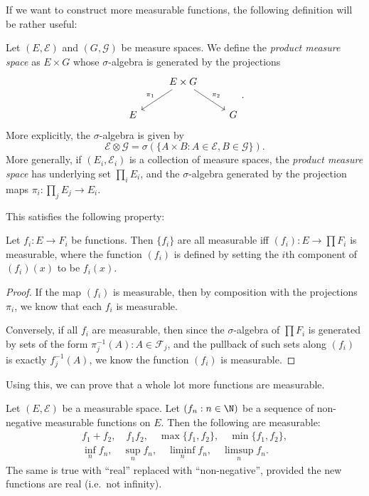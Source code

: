 \documentclass[a4paper]{article}
\begin{document}
If we want to construct more measurable functions, the following definition will be rather useful:
\begin{defi}
  Let $(E, \mathcal{E})$ and $(G, \mathcal{G})$ be measure spaces. We define the \emph{product measure space} as $E \times G$ whose $\sigma$-algebra is generated by the projections
  \[
    \begin{tikzcd}
      & E \times G \ar[ld, "\pi_1"'] \ar[rd, "\pi_2"]\\
      E & & G
    \end{tikzcd}.
  \]
  More explicitly, the $\sigma$-algebra is given by
  \[
    \mathcal{E} \otimes \mathcal{G} = \sigma(\{A \times B: A \in \mathcal{E}, B \in \mathcal{G}\}).
  \]
  More generally, if $(E_i, \mathcal{E}_i)$ is a collection of measure spaces, the \emph{product measure space} has underlying set $\prod_i E_i$, and the $\sigma$-algebra generated by the projection maps $\pi_i: \prod_j E_j \to E_i$.
\end{defi}

This satisfies the following property:
\begin{prop}
  Let $f_i: E \to F_i$ be functions. Then $\{f_i\}$ are all measurable iff $(f_i): E \to \prod F_i$ is measurable, where the function $(f_i)$ is defined by setting the $i$th component of $(f_i)(x)$ to be $f_i(x)$.
\end{prop}

\begin{proof}
  If the map $(f_i)$ is measurable, then by composition with the projections $\pi_i$, we know that each $f_i$ is measurable.

  Conversely, if all $f_i$ are measurable, then since the $\sigma$-algebra of $\prod F_i$ is generated by sets of the form $\pi^{-1}_j(A): A \in \mathcal{F}_j$, and the pullback of such sets along $(f_i)$ is exactly $f_j^{-1}(A)$, we know the function $(f_i)$ is measurable.
\end{proof}

Using this, we can prove that a whole lot more functions are measurable.
\begin{prop}
  Let $(E, \mathcal{E})$ be a measurable space. Let $(f_n: n \in \N)$ be a sequence of non-negative measurable functions on $E$. Then the following are measurable:
  \begin{gather*}
    f_1 + f_2,\quad f_1 f_2,\quad \max \{f_1, f_2\},\quad \min \{f_1, f_2\},\\
    \inf_n f_n,\quad \sup_n f_n,\quad \liminf_n f_n,\quad \limsup_n f_n.
  \end{gather*}
  The same is true with ``real'' replaced with ``non-negative'', provided the new functions are real (i.e.\ not infinity).
\end{prop}
\end{document}
